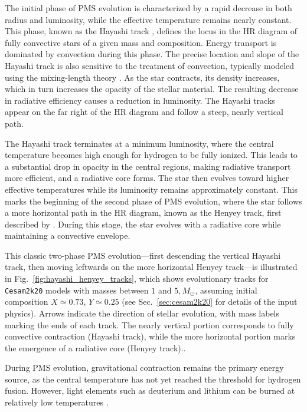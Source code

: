 \documentclass[12pt,a4paper]{article}
\begin{document}
The initial phase of PMS evolution is characterized by a rapid decrease in both radius and luminosity, while the effective temperature remains nearly constant. This phase, known as the Hayashi track \parencite{Hayashi1961}, defines the locus in the HR diagram of fully convective stars of a given mass and composition. Energy transport is dominated by convection during this phase. The precise location and slope of the Hayashi track is also sensitive to the treatment of convection, typically modeled using the mixing-length theory \parencite{CoxGiuli1968a}. As the star contracts, its density increases, which in turn increases the opacity of the stellar material. The resulting decrease in radiative efficiency causes a reduction in luminosity. The Hayashi tracks appear on the far right of the HR diagram and follow a steep, nearly vertical path.

The Hayashi track terminates at a minimum luminosity, where the central temperature becomes high enough for hydrogen to be fully ionized. This leads to a substantial drop in opacity in the central regions, making radiative transport more efficient, and a radiative core forms. The star then evolves toward higher effective temperatures while its luminosity remains approximately constant. This marks the beginning of the second phase of PMS evolution, where the star follows a more horizontal path in the HR diagram, known as the Henyey track, first described by \textcite{HenyeyEtAl1955}. During this stage, the star evolves with a radiative core while maintaining a convective envelope.

This classic two-phase PMS evolution—first descending the vertical Hayashi track, then moving leftwards on the more horizontal Henyey track—is illustrated in Fig.~\ref{fig:hayashi_henyey_tracks}, which shows evolutionary tracks for \texttt{Cesam2k20} models with masses between $1$ and $5,M_\odot$, assuming initial composition $X \simeq 0.73$, $Y \simeq 0.25$ (see Sec.~\ref{sec:cesam2k20} for details of the input physics). Arrows indicate the direction of stellar evolution, with mass labels marking the ends of each track. The nearly vertical portion corresponds to fully convective contraction (Hayashi track), while the more horizontal portion marks the emergence of a radiative core (Henyey track)..

During PMS evolution, gravitational contraction remains the primary energy source, as the central temperature has not yet reached the threshold for hydrogen fusion. However, light elements such as deuterium and lithium can be burned at relatively low temperatures \parencite{KippenhahnEtAl2013}.
\end{document}
